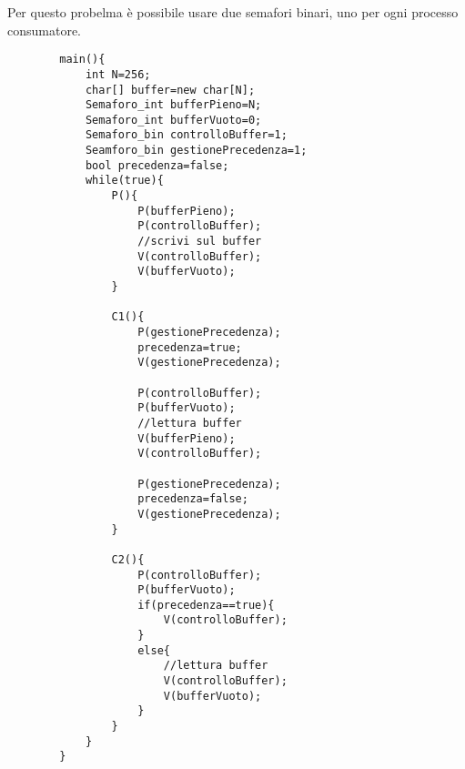 \documentclass{article}
\begin{document}
    Per questo probelma è possibile usare due semafori binari, uno per ogni processo consumatore.
    \begin{lstlisting}
        main(){
            int N=256;
            char[] buffer=new char[N];
            Semaforo_int bufferPieno=N;
            Semaforo_int bufferVuoto=0;
            Semaforo_bin controlloBuffer=1;
            Seamforo_bin gestionePrecedenza=1;
            bool precedenza=false;
            while(true){
                P(){
                    P(bufferPieno);
                    P(controlloBuffer);
                    //scrivi sul buffer
                    V(controlloBuffer);
                    V(bufferVuoto); 
                }

                C1(){
                    P(gestionePrecedenza);
                    precedenza=true;
                    V(gestionePrecedenza);

                    P(controlloBuffer);
                    P(bufferVuoto);
                    //lettura buffer
                    V(bufferPieno);
                    V(controlloBuffer);
                    
                    P(gestionePrecedenza);
                    precedenza=false;
                    V(gestionePrecedenza);
                }

                C2(){
                    P(controlloBuffer);
                    P(bufferVuoto);
                    if(precedenza==true){
                        V(controlloBuffer);
                    }
                    else{
                        //lettura buffer
                        V(controlloBuffer);
                        V(bufferVuoto);
                    }
                }
            }
        }
    \end{lstlisting}
\end{document}
